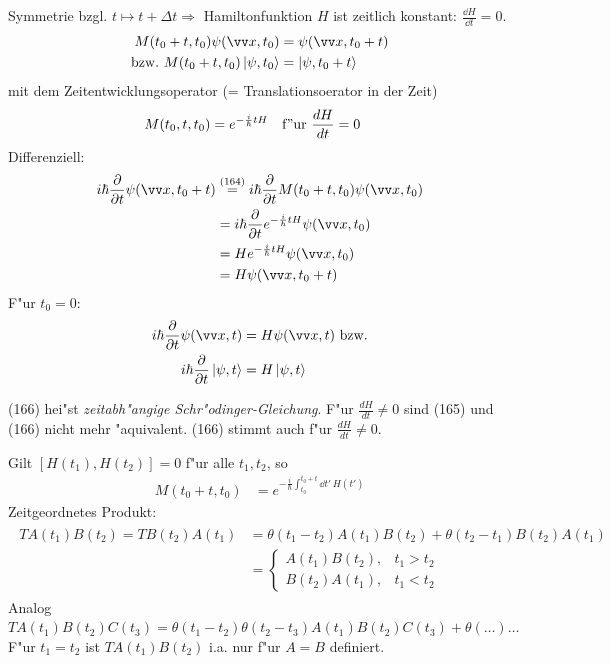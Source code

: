\documentclass[a4paper]{scrartcl}
\begin{document}
{Symmetrie bzgl. $t \mapsto t + \Delta t \Longrightarrow$ Hamiltonfunktion $H$ ist zeitlich konstant: $\frac { \dd H }{\dd t} = 0$.
\begin{align}
\begin{split}
M(t_0+t, t_0) \psi(\vv x, t_0) & = \psi(\vv x, t_0 + t) \\
\mathrm{bzw. \ } M(t_0 + t, t_0) \ket{ \psi, t_0} & = \ket{ \psi, t_0+t}
\end{split}
\end{align}
mit dem Zeitentwicklungsoperator (= Translationsoerator in der Zeit)
\begin{align}
M(t_0,t, t_0) & = e^{- \frac i \hbar t H} \quad \mathrm{f"ur \ } \frac{d H}{dt} = 0
\end{align}
Differenziell:
\begin{align*}
i \hbar \frac \partial {\partial t} \psi(\vv x, t_0 + t) & \stackrel{(164)}= i \hbar \frac \partial {\partial t} M(t_0+t, t_0) \psi(\vv x, t_0) \\
& = i \hbar \frac \partial {\partial t} e^{-\frac i \hbar t H} \psi( \vv x, t_0) \\
& = H e^{-\frac i \hbar t H} \psi(\vv x, t_0) \\
& = H \psi(\vv x, t_0 + t)
\end{align*}
F"ur $t_0 =0$:
\begin{align}
\begin{split}
i \hbar \frac \partial {\partial t} \psi(\vv x, t) & = H \psi( \vv x, t) \ \mathrm{bzw.} \\
i \hbar \frac \partial {\partial t} \ket{ \psi, t} & = H \ket{ \psi, t}
\end{split}
\end{align}

(166) hei"st \emph{zeitabh"angige Schr"odinger-Gleichung}. F"ur $\frac {dH}{dt} \neq 0$ sind (165) und (166) nicht mehr "aquivalent. (166) stimmt auch f"ur $\frac{dH}{dt} \neq 0$.

Gilt $[ H(t_1), H(t_2) ] = 0$ f"ur alle $t_1, t_2$, so 
\begin{align}
M(t_0+t, t_0) & = e^{-\frac i \hbar \int_{t_0}^{t_0+ t} \dd t' \, H(t')}
\end{align}
Zeitgeordnetes Produkt:
\begin{align}
\begin{split}
T A(t_1) B(t_2) = T B(t_2) A(t_1) & = \theta (t_1 - t_2) A(t_1) B(t_2) + \theta(t_2-t_1) B(t_2) A(t_1) \\
& = \begin{cases} A(t_1) B(t_2), & t_1 > t_2 \\
B(t_2) A(t_1), & t_1 < t_2 \end{cases}
\end{split}
\end{align}
Analog $T A(t_1) B(t_2) C(t_3) = \theta(t_1 - t_2) \theta(t_2 - t_3) A(t_1) B(t_2) C(t_3) + \theta(\ldots) \ldots$
F"ur $t_1 = t_2$ ist $T A(t_1) B(t_2)$ i.a. nur f"ur $A=B$ definiert.


}
\end{document}
